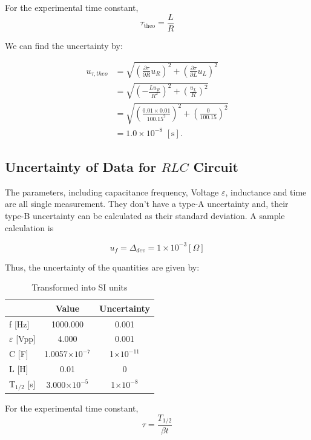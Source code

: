 \documentclass[a4paper]{article}
\begin{document}
For the experimental time constant,
$$\tau_{\text{theo}} = \frac{L}{R}$$

We can find the uncertainty by:

\begin{align*}
	u_{\tau,theo}
	 & = \sqrt{(\frac{\partial \tau}{\partial R}u_R)^2+(\frac{\partial \tau}{\partial L}u_L)^2} \\
	 & = \sqrt{(-\frac{Lu_R}{R^2})^2 + (\frac{u_L}{R})^2}                                       \\
	 & = \sqrt{(\frac{0.01\times 0.01}{100.15^2})^2 + (\frac{0}{100.15})^2}                     \\
	 & = 1.0\times 10^{-8}\,\,[\text{s}].
\end{align*}

\subsection{Uncertainty of Data for $RLC$ Circuit}

The parameters, including capacitance frequency, Voltage $\varepsilon$, inductance and time are all single measurement. They don't have a type-A uncertainty and, their type-B uncertainty can be calculated as their standard deviation. A sample calculation is

$$u_{f} = \Delta_{dev} = 1\times 10^{-3} [\Omega]$$

Thus, the uncertainty of the quantities are given by:
\begin{table}[!htbp]
	\centering
	\begin{tabular}{l c c}
		\hline
		                    & Value                  & Uncertainty        \\
		\hline
		f [Hz]              & 1000.000               & 0.001              \\
		$\varepsilon$ [Vpp] & 4.000                  & 0.001              \\
		C [F]               & 1.0057$\times 10^{-7}$ & 1$\times 10^{-11}$ \\
		L [H]               & 0.01                   & 0                  \\
		T$_{1/2}$ [s]       & 3.000$\times 10^{-5}$  & 1$\times 10^{-8}$  \\
		\hline
	\end{tabular}
	\caption{Transformed into SI units}
\end{table}

For the experimental time constant,
$$\tau = \frac{T_{1/2}}{\beta t}$$
\end{document}
